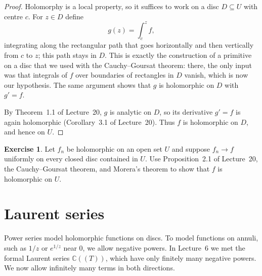\documentclass[11pt]{article}
\theoremstyle{plain}
\theoremstyle{definition}
\newtheorem{exercise}[theorem]{Exercise}
\theoremstyle{boldremark}
\theoremstyle{remark}
\numberwithin{equation}{section}
\newcommand{\C}{\mathbb{C}}
\newcommand{\CLT}{\C((T))}
\newenvironment{lecturefigure}
 {\par\addvspace{0.25em}\begingroup\setlength{\parskip}{0pt}\centering}
 {\par\endgroup\addvspace{0.25em}}
\begin{document}
\begin{lecturefigure}
\end{lecturefigure}

\begin{proof}
Holomorphy is a local property, so it suffices to work on a disc
$D\subseteq U$ with centre $c$. For $z\in D$ define
\[
 g(z)=\int_c^z f,
\]
integrating along the rectangular path that goes horizontally and then
vertically from $c$ to $z$; this path stays in $D$. This is exactly the
construction of a primitive on a disc that we used with the
Cauchy--Goursat theorem: there, the only input was that integrals of $f$
over boundaries of rectangles in $D$ vanish, which is now our hypothesis.
The same argument shows that $g$ is holomorphic on $D$ with $g'=f$.

By Theorem~1.1 of Lecture~20, $g$ is analytic on $D$, so its derivative
$g'=f$ is again holomorphic (Corollary~3.1 of Lecture~20). Thus $f$
is holomorphic on $D$, and hence on $U$.
\end{proof}

\begin{exercise}
Let $f_n$ be holomorphic on an open set $U$ and suppose $f_n\to f$
uniformly on every closed disc contained in $U$. Use
Proposition~2.1 of Lecture~20, the Cauchy--Goursat theorem, and
Morera's theorem to show that $f$ is holomorphic on $U$.
\end{exercise}

\section{Laurent series}
Power series model holomorphic functions on discs. To model functions on
annuli, such as $1/z$ or $e^{1/z}$ near $0$, we allow negative powers.
In Lecture~6 we met the formal Laurent series $\CLT$, which have only
finitely many negative powers. We now allow infinitely many terms in both
directions.
\end{document}
